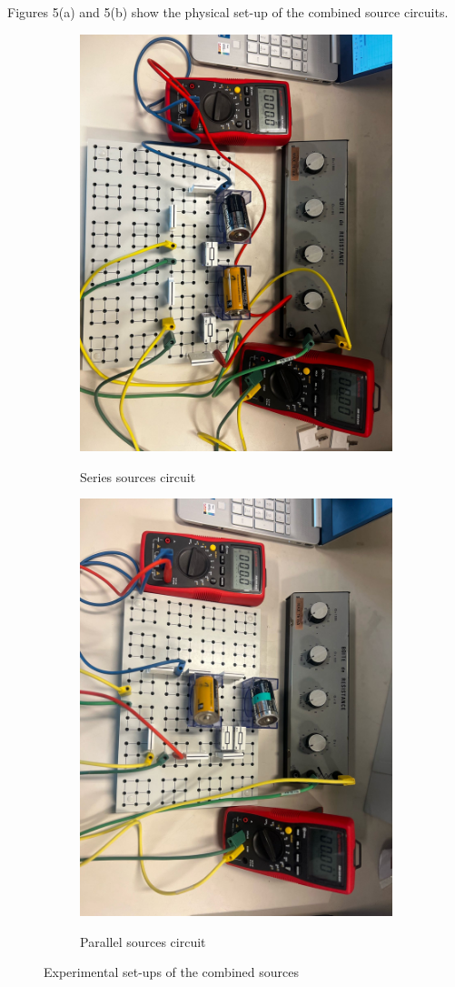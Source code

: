 \documentclass[a4paper]{article}
\begin{document}
Figures 5(a) and 5(b) show the physical set-up of the combined source circuits.

\begin{figure}[!ht]
    \centering
    \begin{subfigure}{0.5\textwidth}
        \centering
        \includegraphics[width = 0.6\linewidth, angle = 90]{series.jpeg}
        \label{fig:5a}
        \caption{Series sources circuit}
    \end{subfigure}%
    \begin{subfigure}{0.5\textwidth}
        \centering
        \includegraphics[width = 0.6\linewidth, angle = 90]{parallel.jpeg}
        \label{fig:5b}
        \caption{Parallel sources circuit}
    \end{subfigure}
    \label{fig:5}
    \caption{Experimental set-ups of the combined sources}
\end{figure}
\end{document}
